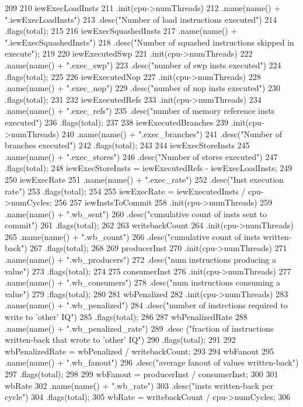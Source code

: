 \begin{DoxyCode}
{209 
210     iewExecLoadInsts
211         .init(cpu->numThreads)
212         .name(name() + ".iewExecLoadInsts")
213         .desc("Number of load instructions executed")
214         .flags(total);
215 
216     iewExecSquashedInsts
217         .name(name() + ".iewExecSquashedInsts")
218         .desc("Number of squashed instructions skipped in execute");
219 
220     iewExecutedSwp
221         .init(cpu->numThreads)
222         .name(name() + ".exec_swp")
223         .desc("number of swp insts executed")
224         .flags(total);
225 
226     iewExecutedNop
227         .init(cpu->numThreads)
228         .name(name() + ".exec_nop")
229         .desc("number of nop insts executed")
230         .flags(total);
231 
232     iewExecutedRefs
233         .init(cpu->numThreads)
234         .name(name() + ".exec_refs")
235         .desc("number of memory reference insts executed")
236         .flags(total);
237 
238     iewExecutedBranches
239         .init(cpu->numThreads)
240         .name(name() + ".exec_branches")
241         .desc("Number of branches executed")
242         .flags(total);
243 
244     iewExecStoreInsts
245         .name(name() + ".exec_stores")
246         .desc("Number of stores executed")
247         .flags(total);
248     iewExecStoreInsts = iewExecutedRefs - iewExecLoadInsts;
249 
250     iewExecRate
251         .name(name() + ".exec_rate")
252         .desc("Inst execution rate")
253         .flags(total);
254 
255     iewExecRate = iewExecutedInsts / cpu->numCycles;
256 
257     iewInstsToCommit
258         .init(cpu->numThreads)
259         .name(name() + ".wb_sent")
260         .desc("cumulative count of insts sent to commit")
261         .flags(total);
262 
263     writebackCount
264         .init(cpu->numThreads)
265         .name(name() + ".wb_count")
266         .desc("cumulative count of insts written-back")
267         .flags(total);
268 
269     producerInst
270         .init(cpu->numThreads)
271         .name(name() + ".wb_producers")
272         .desc("num instructions producing a value")
273         .flags(total);
274 
275     consumerInst
276         .init(cpu->numThreads)
277         .name(name() + ".wb_consumers")
278         .desc("num instructions consuming a value")
279         .flags(total);
280 
281     wbPenalized
282         .init(cpu->numThreads)
283         .name(name() + ".wb_penalized")
284         .desc("number of instrctions required to write to 'other' IQ")
285         .flags(total);
286 
287     wbPenalizedRate
288         .name(name() + ".wb_penalized_rate")
289         .desc ("fraction of instructions written-back that wrote to 'other' IQ")
290         .flags(total);
291 
292     wbPenalizedRate = wbPenalized / writebackCount;
293 
294     wbFanout
295         .name(name() + ".wb_fanout")
296         .desc("average fanout of values written-back")
297         .flags(total);
298 
299     wbFanout = producerInst / consumerInst;
300 
301     wbRate
302         .name(name() + ".wb_rate")
303         .desc("insts written-back per cycle")
304         .flags(total);
305     wbRate = writebackCount / cpu->numCycles;
306 }
\end{DoxyCode}

